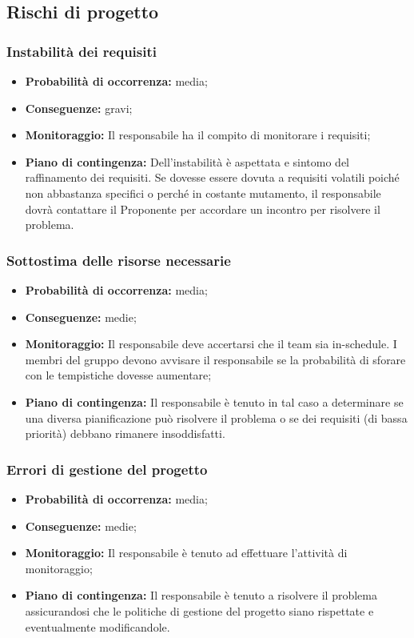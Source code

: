 \subsection{Rischi di progetto}
\subsubsection{Instabilità dei requisiti}
\begin{itemize}
\item \textbf{Probabilità di occorrenza:} media;
\item \textbf{Conseguenze:} gravi;
\item \textbf{Monitoraggio:} Il responsabile ha il compito di monitorare i requisiti;
\item \textbf{Piano di contingenza:} Dell'instabilità è aspettata e sintomo del raffinamento dei requisiti.	Se dovesse essere dovuta a requisiti volatili poiché non abbastanza specifici o perché in costante mutamento, il responsabile dovrà contattare il Proponente per accordare un incontro per risolvere il problema.
\end{itemize}
\subsubsection{Sottostima delle risorse necessarie}
\begin{itemize}
\item \textbf{Probabilità di occorrenza:} media;
\item \textbf{Conseguenze:} medie;
\item \textbf{Monitoraggio:} Il responsabile deve accertarsi che il team sia in-schedule. I membri del gruppo devono avvisare il responsabile se la probabilità di sforare con le tempistiche dovesse aumentare;
\item \textbf{Piano di contingenza:} Il responsabile è tenuto in tal caso a determinare se una diversa pianificazione può risolvere il problema o se dei requisiti (di bassa priorità) debbano rimanere insoddisfatti.
\end{itemize}
\subsubsection{Errori di gestione del progetto}
\begin{itemize}
\item \textbf{Probabilità di occorrenza:} media;
\item \textbf{Conseguenze:} medie;
\item \textbf{Monitoraggio:} Il responsabile è tenuto ad effettuare l'attività di monitoraggio;
\item \textbf{Piano di contingenza:} Il responsabile è tenuto a risolvere il problema assicurandosi che le politiche	di gestione del progetto siano rispettate e eventualmente modificandole.
\end{itemize}
\pagebreak